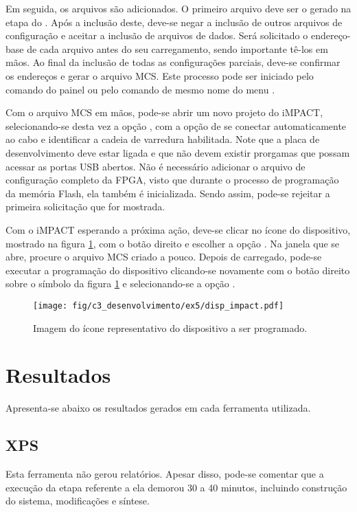 \documentclass[11pt,a4paper,oneside]{book}
\begin{document}
Em seguida, os arquivos são adicionados.
O primeiro arquivo deve ser o  gerado na etapa do .
Após a inclusão deste, deve-se negar a inclusão de outros arquivos de configuração e aceitar a inclusão de arquivos de dados.
Será solicitado o endereço-base de cada arquivo antes do seu carregamento, sendo importante tê-los em mãos.
Ao final da inclusão de todas as configurações parciais, deve-se confirmar os endereços e gerar o arquivo MCS.
Este processo pode ser iniciado pelo comando  do painel  ou pelo comando de mesmo nome do menu .

Com o arquivo MCS em mãos, pode-se abrir um novo projeto do iMPACT, selecionando-se desta vez a opção , com a opção de se conectar automaticamente ao cabo e identificar a cadeia de varredura habilitada.
Note que a placa de desenvolvimento deve estar ligada e que não devem existir prorgamas que possam acessar as portas USB abertos.
Não é necessário adicionar o arquivo de configuração completo da FPGA, visto que durante o processo de programação da memória Flash, ela também é inicializada.
Sendo assim, pode-se rejeitar a primeira solicitação que for mostrada.

Com o iMPACT esperando a próxima ação, deve-se clicar no ícone do dispositivo, mostrado na figura \ref{fig:exp5:disp_impact}, com o botão direito e escolher a opção .
Na janela que se abre, procure o arquivo MCS criado a pouco.
Depois de carregado, pode-se executar a programação do dispositivo clicando-se novamente com o botão direito sobre o símbolo da figura \ref{fig:exp5:disp_impact} e selecionando-se a opção .

\begin{figure}[htp]
\centering
\texttt{[image: fig/c3\_desenvolvimento/ex5/disp\_impact.pdf]}
\caption{Imagem do ícone representativo do dispositivo a ser programado.}
\label{fig:exp5:disp_impact}
\end{figure}

\section{Resultados}
Apresenta-se abaixo os resultados gerados em cada ferramenta utilizada.

\subsection{XPS}
Esta ferramenta não gerou relatórios.
Apesar disso, pode-se comentar que a execução da etapa referente a ela demorou 30 a 40 minutos, incluindo construção do sistema, modificações e síntese.
\end{document}
